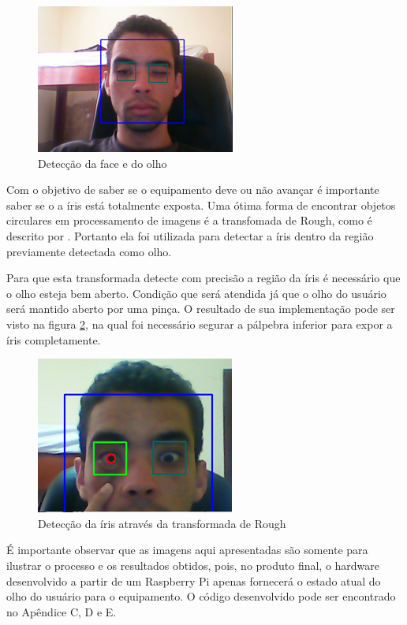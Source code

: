 \begin{figure}[H]
		\centering
			\includegraphics[scale=1.0]{figuras/faceolho.png}
		\caption{Detecção da face e do olho}
		\label{faceolho}
\end{figure}

Com o objetivo de saber se o equipamento deve ou não avançar é importante saber se o a íris está totalmente exposta. Uma ótima forma de encontrar objetos circulares em processamento de imagens é a transfomada de Rough, como é descrito por . Portanto ela foi utilizada para detectar a íris dentro da região previamente detectada como olho. 

Para que esta transformada detecte com precisão a região da íris é necessário que o olho esteja bem aberto. Condição que será atendida já que o olho do usuário será mantido aberto por uma pinça. O resultado de sua implementação pode ser visto na figura \ref{rough}, na qual foi necessário segurar a pálpebra inferior para expor a íris completamente.


\begin{figure}[H]
		\centering
			\includegraphics[scale=1.0]{figuras/rough.png}
		\caption{Detecção da íris através da transformada de Rough}
		\label{rough}
\end{figure}

É importante observar que as imagens aqui apresentadas são somente para ilustrar o processo e os resultados obtidos, pois, no produto final, o hardware desenvolvido a partir de um Raspberry Pi apenas fornecerá o estado atual do olho do usuário para o equipamento. O código desenvolvido pode ser encontrado no Apêndice C, D e E.



